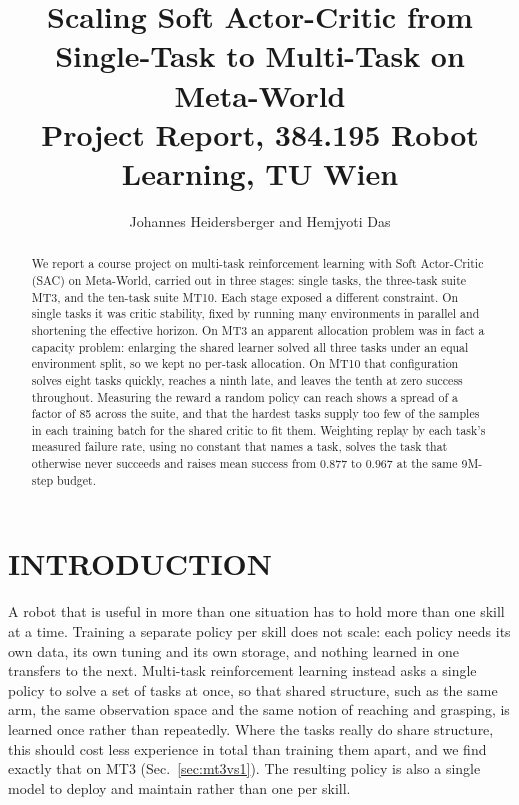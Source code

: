 \documentclass[letterpaper, 10 pt, conference]{ieeeconf}
\title{\LARGE \bf
Scaling Soft Actor-Critic from Single-Task to Multi-Task on Meta-World\\[4pt]
\large Project Report, 384.195 Robot Learning, TU Wien
}
\author{Johannes Heidersberger and Hemjyoti Das}
\begin{document}
\maketitle
\pagestyle{plain}

\begin{abstract}

We report a course project on multi-task reinforcement learning with Soft Actor-Critic
(SAC) on Meta-World, carried out in three stages: single tasks, the three-task suite MT3, and
the ten-task suite MT10. Each stage exposed a different constraint. On single tasks it was
critic stability, fixed by running many environments in parallel and shortening the effective
horizon. On MT3 an apparent allocation problem was in fact a capacity problem: enlarging the
shared learner solved all three tasks under an equal environment split, so we kept no per-task
allocation. On MT10 that configuration solves eight tasks quickly, reaches a ninth late, and
leaves the tenth at zero success throughout. Measuring the reward a random policy can reach
shows a spread of a factor of 85 across the suite, and that the hardest tasks supply too few of
the samples in each training batch for the shared critic to fit them. Weighting replay by each
task's measured failure rate, using no constant that names a task, solves the task that
otherwise never succeeds and raises mean success from $0.877$ to $0.967$ at the same 9M-step
budget.

\end{abstract}

\section{INTRODUCTION}

A robot that is useful in more than one situation has to hold more than one skill at a time.
Training a separate policy per skill does not scale: each policy needs its own data, its own
tuning and its own storage, and nothing learned in one transfers to the next. Multi-task
reinforcement learning instead asks a single policy to solve a set of tasks at once, so that
shared structure, such as the same arm, the same observation space and the same notion of
reaching and grasping, is learned once rather than repeatedly. Where the tasks really do share
structure, this should cost less experience in total than training them apart, and we
find exactly that on MT3 (Sec.~\ref{sec:mt3vs1}). The resulting policy is also a single model
to deploy and maintain rather than one per skill.
\end{document}

